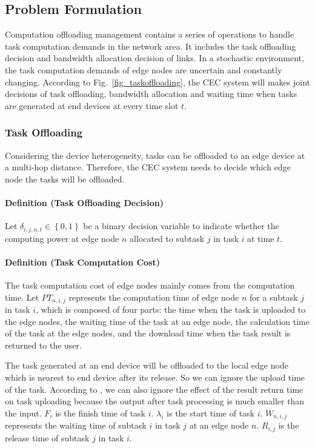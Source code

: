 \documentclass[10pt, conference, letterpaper]{IEEEtran}
\begin{document}
\subsection{Problem Formulation}
Computation offloading management contains a series of operations to handle task computation demands in the network area. It includes the task offloading decision and bandwidth allocation decision of links. In a stochastic environment, the task computation demands of edge nodes are uncertain and constantly changing. According to Fig.~\ref{fig_taskoffloading}, the CEC system will makes joint decisions of task offloading, bandwidth allocation and waiting time when tasks are generated at end devices at every time slot $t$.

\subsubsection{Task Offloading}
Considering the device heterogeneity, tasks can be offloaded to an edge device at a multi-hop distance. Therefore, the CEC system needs to decide which edge node the tasks will be offloaded. 


\paragraph{Definition (Task Offloading Decision)} Let $\delta_{i,j,n,t} \in \left\{0,1\right\} $ be a binary decision variable to indicate whether the computing power at edge node $n$ allocated to subtask $j$ in task $i$ at time $t$.


\paragraph{Definition (Task Computation Cost)} The task computation cost of edge nodes mainly comes from the computation time. Let $PT_{n,i,j}$ represents the computation time of edge node $n$ for a subtask $j$ in task $i$, which is composed of four parts: the time when the task is uploaded to the edge nodes, the waiting time of the task at an edge node, the calculation time of the task at the edge nodes, and the download time when the task result is returned to the user.

The task generated at an end device will be offloaded to the local edge node which is nearest to end device after its release. So we can ignore the upload time of the task. According to \cite{cheng2018energy}, we can also ignore the effect of the result return time on task uploading because the output after task processing is much smaller than the input. $F_i$ is the finish time of task $i$. $\lambda_i$ is the start time of task $i$. $W_{n,i,j}$ represents the waiting time of subtask $i$ in task $j$ at an edge node $n$. $R_{i,j}$ is the release time of subtask $j$ in task $i$.
\end{document}
